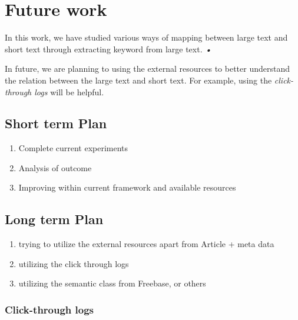 \chapter{Future work}


In this work, we have studied various ways of mapping between large text and short text through extracting keyword from large text. \textit{•}

In future, we are planning to using the external resources to better understand the relation between the large text and short text. For example, using the \textit{click-through logs} will be helpful.

\section{Short term Plan}

\begin{enumerate}
\item{Complete current experiments}
\item{Analysis of outcome}
\item{Improving within current framework and available resources}
\end{enumerate}


\section{Long term Plan}

\begin{enumerate}
\item{trying to utilize the external resources apart from Article + meta data}
\item{utilizing the click through logs}
\item{utilizing the semantic class from Freebase, or others }
\end{enumerate}


\subsection{Click-through logs}


